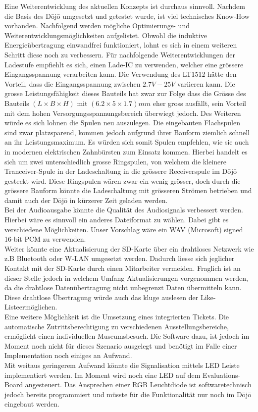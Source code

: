Eine Weiterentwicklung des aktuellen Konzepts ist durchaus sinnvoll. Nachdem die Basis des Dōjō umgesetzt und getestet wurde, ist viel technisches \glqq Know-How \grqq vorhanden. Nachfolgend werden mögliche Optimierungs- und Weiterentwicklungsmöglichkeiten aufgelistet. 
Obwohl die induktive Energieübertragung einwandfrei funktioniert, lohnt es sich in einem weiteren Schritt diese noch zu verbessern. Für nachfolgende Weiterentwicklungen der Ladestufe empfiehlt es sich, einen Lade-IC zu verwenden, welcher eine grössere Eingangsspannung verarbeiten kann. Die Verwendung des LT1512 hätte den Vorteil, dass die Eingangsspannung zwischen $2.7V - 25V$ variieren kann. Die grosse Leistungsfähigkeit dieses Bauteils hat zwar zur Folge dass die Grösse des Bauteils $(L \times B \times H)$ mit $(6.2\times 5\times 1.7)mm$ eher gross ausfällt, sein Vorteil mit dem hohen Versorgungsspannungsbereich überwiegt jedoch. Des Weiteren würde es sich lohnen die Spulen neu auszulegen. Die eingebauten Flachspulen sind zwar platzsparend, kommen jedoch aufgrund ihrer Bauform ziemlich schnell an ihr Leistungsmaximum. Es würden sich somit Spulen empfehlen, wie sie auch in modernen elektrischen Zahnbürsten zum Einsatz kommen. Hierbei handelt es sich um zwei unterschiedlich grosse Ringspulen, von welchem die kleinere Tranceiver-Spule in der Ladeschaltung in die grössere Receiverspule im Dōjō gesteckt wird. Diese Ringspulen wären zwar ein wenig grösser, doch durch die grössere Bauform könnte die Ladeschaltung mit grösseren Strömen betrieben und damit auch der Dōjō in kürzerer Zeit geladen werden.\\
Bei der Audioausgabe könnte die Qualität des Audiosignals verbessert werden. Hierbei wäre es sinnvoll ein anderes Dateiformat zu wählen. Dabei gibt es verschiedene Möglichkeiten. Unser Vorschlag wäre ein WAV (Microsoft) signed 16-bit PCM zu verwenden.\\
Weiter könnte eine Aktualisierung der SD-Karte über ein drahtloses Netzwerk wie z.B Bluetooth oder W-LAN umgesetzt werden. Dadurch liesse sich jeglicher Kontakt mit der SD-Karte durch einen Mitarbeiter vermeiden. Fraglich ist an dieser Stelle jedoch in welchem Umfang Aktualisierungen vorgenommen werden, da die drahtlose Datenübertragung nicht unbegrenzt Daten übermitteln kann. Diese drahtlose Übertragung würde auch das kluge auslesen der \glqq Like-Liste\grqq ermöglichen.\\
Eine weitere Möglichkeit ist die Umsetzung eines integrierten Tickets. Die automatische Zutrittsberechtigung zu verschiedenen Ausstellungsbereiche, ermöglicht einen individuellen Museumsbesuch. Die Software dazu, ist jedoch im Moment noch nicht für dieses Szenario ausgelegt und benötigt im Falle einer Implementation noch einiges an Aufwand.\\
Mit weitaus geringerem Aufwand könnte die Signalisation mittels LED Leiste implementiert werden. Im Moment wird noch eine LED auf dem Evaluations-Board angesteuert. Das Ansprechen einer RGB Leuchtdiode ist softwaretechnisch jedoch bereits programmiert und müsste für die Funktionalität nur noch im Dōjō eingebaut werden.